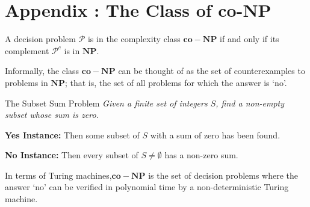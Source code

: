 \section{Appendix : The Class of co-NP}

A decision problem $\mathcal{P}$ is in the complexity class $\mathbf{co-NP}$ if and only if its complement $\mathcal{P}^{c}$ is in $\mathbf{NP}$. 

Informally, the class $\mathbf{co-NP}$ can be thought of as the set of counterexamples to problems in $\mathbf{NP}$; that is, the set of all problems for which the answer is `no'. 

\begin{exmp}{The Subset Sum Problem}
    \emph{Given a finite set of integers $S$, find a non-empty subset whose sum is zero.}

    \textbf{Yes Instance:} Then some subset of $S$ with a sum of zero has been found.

    \textbf{No Instance:} Then every subset of $S \neq \emptyset$ has a non-zero sum.
\end{exmp}


In terms of Turing machines,$\mathbf{co-NP}$ is the set of decision problems where the answer `no' can be verified in polynomial time by a non-deterministic Turing machine.

